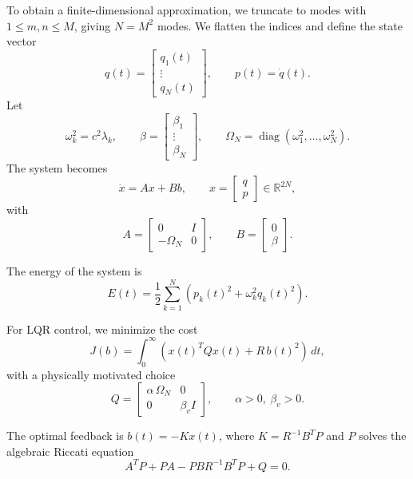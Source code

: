 \documentclass[11pt]{article}
\newcommand{\R}{\mathbb{R}}
\newcommand{\dd}{\,d}
\begin{document}
To obtain a finite-dimensional approximation, we truncate to modes with $1 \leq m,n \leq M$, giving $N = M^2$ modes. We flatten the indices and define the state vector
\[
q(t)=\begin{bmatrix} q_1(t) \\ \vdots \\ q_N(t) \end{bmatrix},
\qquad
p(t)=\dot q(t).
\]
Let
\[
\omega_k^2=c^2\lambda_k,
\qquad
\beta=\begin{bmatrix}\beta_1 \\ \vdots \\ \beta_N\end{bmatrix},
\qquad
\Omega_N = \operatorname{diag}(\omega_1^2,\dots,\omega_N^2).
\]
The system becomes
\begin{equation}
\label{eq:firstorder}
\dot x = A x + B b,
\qquad
x=\begin{bmatrix} q \\ p \end{bmatrix}\in\R^{2N},
\end{equation}
with
\begin{equation}
\label{eq:AB}
A=
\begin{bmatrix}
0 & I \\
-\Omega_N & 0
\end{bmatrix},
\qquad
B=
\begin{bmatrix}
0 \\
\beta
\end{bmatrix}.
\end{equation}

The energy of the system is
\begin{equation}
\label{eq:energy}
E(t)=\frac12\sum_{k=1}^N \left(p_k(t)^2 + \omega_k^2 q_k(t)^2\right).
\end{equation}

For LQR control, we minimize the cost
\begin{equation}
\label{eq:cost}
J(b)=\int_0^{\infty} \left( x(t)^T Q x(t) + R\,b(t)^2 \right)\dd t,
\end{equation}
with a physically motivated choice
\begin{equation}
\label{eq:Qchoice}
Q=
\begin{bmatrix}
\alpha\,\Omega_N & 0 \\
0 & \beta_v I
\end{bmatrix},
\qquad \alpha>0,\ \beta_v>0.
\end{equation}

The optimal feedback is $b(t) = -K x(t)$, where $K = R^{-1} B^T P$ and $P$ solves the algebraic Riccati equation
\begin{equation}
\label{eq:ARE}
A^T P + P A - P B R^{-1} B^T P + Q = 0.
\end{equation}
\end{document}
